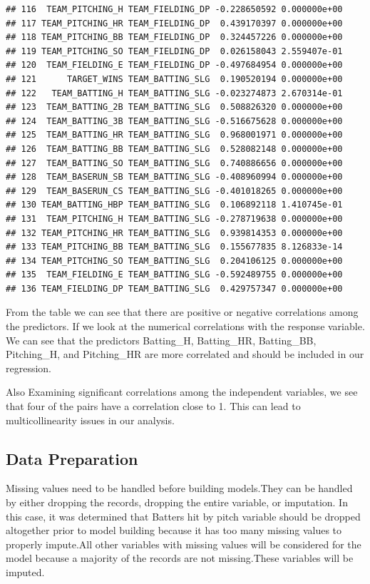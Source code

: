 \documentclass[
]{article}
\begin{document}
\begin{verbatim}
## 116  TEAM_PITCHING_H TEAM_FIELDING_DP -0.228650592 0.000000e+00
## 117 TEAM_PITCHING_HR TEAM_FIELDING_DP  0.439170397 0.000000e+00
## 118 TEAM_PITCHING_BB TEAM_FIELDING_DP  0.324457226 0.000000e+00
## 119 TEAM_PITCHING_SO TEAM_FIELDING_DP  0.026158043 2.559407e-01
## 120  TEAM_FIELDING_E TEAM_FIELDING_DP -0.497684954 0.000000e+00
## 121      TARGET_WINS TEAM_BATTING_SLG  0.190520194 0.000000e+00
## 122   TEAM_BATTING_H TEAM_BATTING_SLG -0.023274873 2.670314e-01
## 123  TEAM_BATTING_2B TEAM_BATTING_SLG  0.508826320 0.000000e+00
## 124  TEAM_BATTING_3B TEAM_BATTING_SLG -0.516675628 0.000000e+00
## 125  TEAM_BATTING_HR TEAM_BATTING_SLG  0.968001971 0.000000e+00
## 126  TEAM_BATTING_BB TEAM_BATTING_SLG  0.528082148 0.000000e+00
## 127  TEAM_BATTING_SO TEAM_BATTING_SLG  0.740886656 0.000000e+00
## 128  TEAM_BASERUN_SB TEAM_BATTING_SLG -0.408960994 0.000000e+00
## 129  TEAM_BASERUN_CS TEAM_BATTING_SLG -0.401018265 0.000000e+00
## 130 TEAM_BATTING_HBP TEAM_BATTING_SLG  0.106892118 1.410745e-01
## 131  TEAM_PITCHING_H TEAM_BATTING_SLG -0.278719638 0.000000e+00
## 132 TEAM_PITCHING_HR TEAM_BATTING_SLG  0.939814353 0.000000e+00
## 133 TEAM_PITCHING_BB TEAM_BATTING_SLG  0.155677835 8.126833e-14
## 134 TEAM_PITCHING_SO TEAM_BATTING_SLG  0.204106125 0.000000e+00
## 135  TEAM_FIELDING_E TEAM_BATTING_SLG -0.592489755 0.000000e+00
## 136 TEAM_FIELDING_DP TEAM_BATTING_SLG  0.429757347 0.000000e+00
\end{verbatim}

From the table we can see that there are positive or negative
correlations among the predictors. If we look at the numerical
correlations with the response variable. We can see that the predictors
Batting\_H, Batting\_HR, Batting\_BB, Pitching\_H, and Pitching\_HR are
more correlated and should be included in our regression.

Also Examining significant correlations among the independent variables,
we see that four of the pairs have a correlation close to 1. This can
lead to multicollinearity issues in our analysis.

\hypertarget{data-preparation}{%
\subsection{Data Preparation}\label{data-preparation}}

Missing values need to be handled before building models.They can be
handled by either dropping the records, dropping the entire variable, or
imputation. In this case, it was determined that Batters hit by pitch
variable should be dropped altogether prior to model building because it
has too many missing values to properly impute.All other variables with
missing values will be considered for the model because a majority of
the records are not missing.These variables will be imputed.
\end{document}
